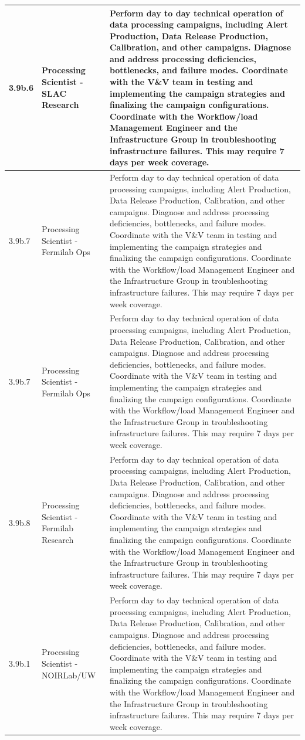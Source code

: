 \begin{longtable} {|p{}|p{}|p{}|}
{3.9b.6}&{Processing Scientist - SLAC Research}&{Perform day to day technical operation of data processing campaigns, including Alert Production, Data Release Production, Calibration, and other campaigns. Diagnose and address processing deficiencies, bottlenecks, and failure modes. Coordinate with the V\&V team in testing and implementing the campaign strategies and finalizing the campaign configurations. Coordinate with the Workflow/load Management Engineer and the Infrastructure Group in troubleshooting infrastructure failures. This may require 7 days per week coverage.} \\ \hline
{3.9b.7}&{Processing Scientist - Fermilab Ops}&{Perform day to day technical operation of data processing campaigns, including Alert Production, Data Release Production, Calibration, and other campaigns. Diagnose and address processing deficiencies, bottlenecks, and failure modes. Coordinate with the V\&V team in testing and implementing the campaign strategies and finalizing the campaign configurations. Coordinate with the Workflow/load Management Engineer and the Infrastructure Group in troubleshooting infrastructure failures. This may require 7 days per week coverage.} \\ \hline
{3.9b.7}&{Processing Scientist - Fermilab Ops}&{Perform day to day technical operation of data processing campaigns, including Alert Production, Data Release Production, Calibration, and other campaigns. Diagnose and address processing deficiencies, bottlenecks, and failure modes. Coordinate with the V\&V team in testing and implementing the campaign strategies and finalizing the campaign configurations. Coordinate with the Workflow/load Management Engineer and the Infrastructure Group in troubleshooting infrastructure failures. This may require 7 days per week coverage.} \\ \hline
{3.9b.8}&{Processing Scientist - Fermilab Research}&{Perform day to day technical operation of data processing campaigns, including Alert Production, Data Release Production, Calibration, and other campaigns. Diagnose and address processing deficiencies, bottlenecks, and failure modes. Coordinate with the V\&V team in testing and implementing the campaign strategies and finalizing the campaign configurations. Coordinate with the Workflow/load Management Engineer and the Infrastructure Group in troubleshooting infrastructure failures. This may require 7 days per week coverage.} \\ \hline
{3.9b.1}&{Processing Scientist - NOIRLab/UW}&{Perform day to day technical operation of data processing campaigns, including Alert Production, Data Release Production, Calibration, and other campaigns. Diagnose and address processing deficiencies, bottlenecks, and failure modes. Coordinate with the V\&V team in testing and implementing the campaign strategies and finalizing the campaign configurations. Coordinate with the Workflow/load Management Engineer and the Infrastructure Group in troubleshooting infrastructure failures. This may require 7 days per week coverage.} \\ \hline

\end{longtable}
